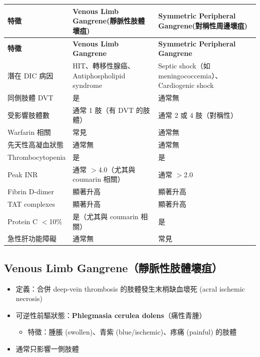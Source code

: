 \documentclass[12pt,a4paper]{article}
\begin{document}
\begin{longtable}{p{4cm}p{5.5cm}p{5.5cm}}
\toprule
\textbf{特徵} & \textbf{Venous Limb Gangrene\newline (靜脈性肢體壞疽)} & \textbf{Symmetric Peripheral Gangrene\newline (對稱性周邊壞疽)} \\
\midrule
\endfirsthead
\toprule
\textbf{特徵} & \textbf{Venous Limb Gangrene} & \textbf{Symmetric Peripheral Gangrene} \\
\midrule
\endhead
\bottomrule
\endfoot

潛在 DIC 病因 & HIT、轉移性腺癌、\newline Antiphospholipid syndrome & Septic shock（如 meningococcemia）、\newline Cardiogenic shock \\
\midrule
同側肢體 DVT & 是 & 通常無 \\
\midrule
受影響肢體數 & 通常 1 肢（有 DVT 的肢體） & 通常 2 或 4 肢（對稱性） \\
\midrule
Warfarin 相關 & 常見 & 通常無 \\
\midrule
先天性高凝血狀態 & 通常無 & 通常無 \\
\midrule
Thrombocytopenia & 是 & 是 \\
\midrule
Peak INR & 通常 $>$4.0（尤其與 coumarin 相關） & 通常 $>$2.0 \\
\midrule
Fibrin D-dimer & 顯著升高 & 顯著升高 \\
\midrule
TAT complexes & 顯著升高 & 顯著升高 \\
\midrule
Protein C $<$10\% & 是（尤其與 coumarin 相關） & 是 \\
\midrule
急性肝功能障礙 & 通常無 & 常見 \\
\bottomrule
\end{longtable}

\subsection{Venous Limb Gangrene（靜脈性肢體壞疽）}

\begin{itemize}
    \item 定義：合併 deep-vein thrombosis 的肢體發生末梢缺血壞死 (acral ischemic necrosis)
    \item 可逆性前驅狀態：\textbf{Phlegmasia cerulea dolens}（痛性青腫）
    \begin{itemize}
        \item 特徵：腫脹 (swollen)、青紫 (blue/ischemic)、疼痛 (painful) 的肢體
    \end{itemize}
    \item 通常只影響一側肢體
\end{itemize}
\end{document}

